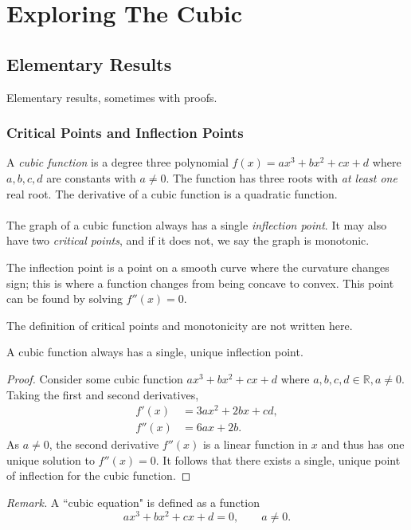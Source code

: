 \documentclass[12pt]{article}
\newcommand{\R}{\mathbb{R}}
\begin{document}
\pagebreak 

\section{Exploring The Cubic}

\subsection{Elementary Results}
Elementary results, sometimes with proofs.

\subsubsection{Critical Points and Inflection Points}
A \textit{cubic function} is a degree three polynomial $f(x) = ax^3 + bx^2 + cx + d$ where $a, b, c, d$ are constants with $a \neq 0$. The function has three roots with \textit{at least one} real root. The derivative of a cubic function is a quadratic function.\\\\
The graph of a cubic function always has a single \textit{inflection point}. It may also have two \textit{critical points}, and if it does not, we say the graph is monotonic.
\begin{dfn}
The inflection point is a point on a smooth curve where the curvature changes sign; this is where a function changes from being concave to convex. This point can be found by solving $f''(x) = 0$.
\end{dfn}
The definition of critical points and monotonicity are not written here.
\begin{thm}
A cubic function always has a single, unique inflection point.
\end{thm}
\begin{proof}
Consider some cubic function $ax^3 + bx^2 + cx + d$ where $a, b, c, d \in \R, a \neq 0$. Taking the first and second derivatives,
\begin{align*}
    f'(x) &= 3ax^2 + 2bx + cd,\\
    f''(x) &= 6ax + 2b.
\end{align*}
As $a \neq 0$, the second derivative $f''(x)$ is a linear function in $x$ and thus has one unique solution to $f''(x) = 0$. It follows that there exists a single, unique point of inflection for the cubic function.
\end{proof}
\textit{Remark.} A ``cubic equation" is defined as a function
\begin{equation*}
    ax^3 + bx^2 + cx + d = 0,\qquad a \neq 0.
\end{equation*}
\end{document}
